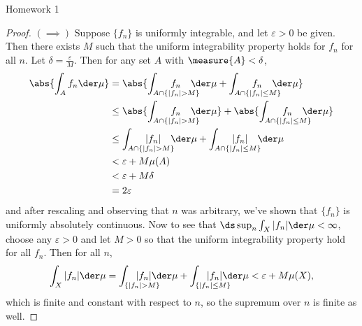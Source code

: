 \documentclass[12pt,letterpaper]{article}
\begin{document}
\pagestyle{fancy}
\begin{center}
{\Large Homework 1}%
\end{center}

\begin{proof}$(\implies)$
Suppose $\{f_n\}$ is uniformly integrable, and let $\varepsilon>0$ be given. Then there exists $M$ such that the uniform integrability property holds for $f_n$ for all $n$. Let $\delta=\frac{\varepsilon}{M}$. Then for any \mumeasurable{} set $A$ with $\measure{A}<\delta$, 
\begin{align*}
\abs{\int_A f_n \der\mu}
&= \abs{{\int_{A\cap\{|f_n|>M\}}}\hspace*{-3em}f_n\hspace*{1em}\der\mu 
 +      {\int_{A\cap\{|f_n|\leq M\}}}\hspace*{-3em}f_n\hspace*{1em}\der\mu} \\
&\leq \abs{{\int_{A\cap\{|f_n|>M\}}}\hspace*{-3em}f_n\hspace*{1em}\der\mu} 
 +      \abs{{\int_{A\cap\{|f_n|\leq M\}}}\hspace*{-3em}f_n\hspace*{1em}\der\mu} \\
&\leq {\int_{A\cap\{|f_n|>M\}}}\hspace*{-3em}|f_n|\hspace*{1em}\der\mu 
 +      {\int_{A\cap\{|f_n|\leq M\}}}\hspace*{-3em}|f_n|\hspace*{1em}\der\mu \\
&< \varepsilon + M\mu(A)\\
&< \varepsilon + M\delta \\
&= 2\varepsilon
\end{align*}
and after rescaling and observing that $n$ was arbitrary, we've shown that $\{f_n\}$ is uniformly absolutely continuous. Now to see that $\ds\sup_n\int_X |f_n| \der\mu < \infty$, choose any $\varepsilon>0$ and let $M>0$ so that the uniform integrability property hold for all $f_n$. Then for all $n$,
\begin{align*}
\int_X |f_n|\der\mu 
&= {\int_{\{|f_n|>M\}}}\hspace*{-2.5em}|f_n|\hspace*{0em}\der\mu 
 +      {\int_{\{|f_n|\leq M\}}}\hspace*{-2.5em}|f_n|\hspace*{0em}\der\mu 
< \varepsilon + M\mu(X),\\
\end{align*}
which is finite and constant with respect to $n$, so the supremum over $n$ is finite as well. 
\end{proof}
\end{document}
